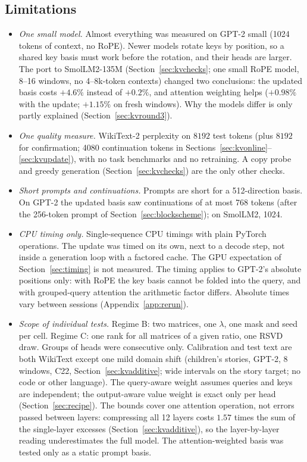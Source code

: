 \documentclass[10pt]{article}
\theoremstyle{plain}
\theoremstyle{definition}
\theoremstyle{remark}
\begin{document}
\subsection{Limitations}
\label{sec:limits}
\begin{itemize}[leftmargin=2em,itemsep=1pt]
\item \emph{One small model.} Almost everything was measured on GPT-2 small (1024 tokens of context, no RoPE). Newer models rotate keys by position, so a shared key basis must work before the rotation, and their heads are larger. The port to SmolLM2-135M (Section~\ref{sec:kvchecks}; one small RoPE model, 8--16 windows, no 4--8k-token contexts) changed two conclusions: the updated basis costs $+4.6\%$ instead of $+0.2\%$, and attention weighting helps ($+0.98\%$ with the update; $+1.15\%$ on fresh windows). Why the models differ is only partly explained (Section~\ref{sec:kvround3}).
\item \emph{One quality measure.} WikiText-2 perplexity on $8192$ test tokens (plus $8192$ for confirmation; 4080 continuation tokens in Sections~\ref{sec:kvonline}--\ref{sec:kvupdate}), with no task benchmarks and no retraining. A copy probe and greedy generation (Section~\ref{sec:kvchecks}) are the only other checks.
\item \emph{Short prompts and continuations.} Prompts are short for a 512-direction basis. On GPT-2 the updated basis saw continuations of at most 768 tokens (after the 256-token prompt of Section~\ref{sec:blockscheme}); on SmolLM2, 1024.
\item \emph{CPU timing only.} Single-sequence CPU timings with plain PyTorch operations. The update was timed on its own, next to a decode step, not inside a generation loop with a factored cache. The GPU expectation of Section~\ref{sec:timing} is not measured. The timing applies to GPT-2's absolute positions only: with RoPE the key basis cannot be folded into the query, and with grouped-query attention the arithmetic factor differs. Absolute times vary between sessions (Appendix~\ref{app:rerun}).
\item \emph{Scope of individual tests.} Regime B: two matrices, one $\lambda$, one mask and seed per cell. Regime C: one rank for all matrices of a given ratio, one RSVD draw. Groups of heads were consecutive only. Calibration and test text are both WikiText except one mild domain shift (children's stories, GPT-2, 8 windows, C22, Section~\ref{sec:kvadditive}; wide intervals on the story target; no code or other language). The query-aware weight assumes queries and keys are independent; the output-aware value weight is exact only per head (Section~\ref{sec:recipe}). The bounds cover one attention operation, not errors passed between layers: compressing all 12 layers costs $1.57$ times the sum of the single-layer excesses (Section~\ref{sec:kvadditive}), so the layer-by-layer reading underestimates the full model. The attention-weighted basis was tested only as a static prompt basis.

\end{itemize}
\end{document}
